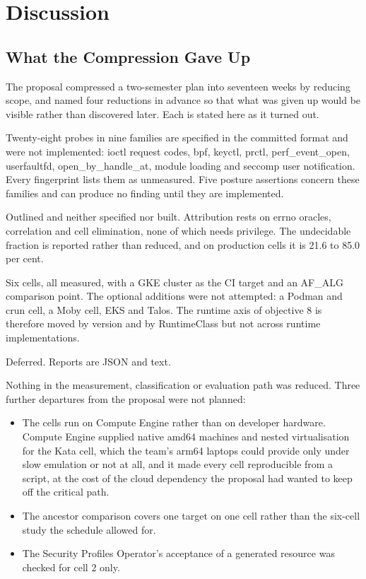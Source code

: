 \chapter{Discussion}
\label{ch:discussion}

\section{What the Compression Gave Up}

The proposal compressed a two-semester plan into seventeen weeks by reducing scope, and named four reductions in advance so that what was given up would be visible rather than discovered later. Each is stated here as it turned out.

\begin{description}[font=\normalfont\bfseries,leftmargin=1em]
\item[The deferred corpus set.] Twenty-eight probes in nine families are specified in the committed format and were not implemented: ioctl request codes, bpf, keyctl, prctl, perf\_event\_open, userfaultfd, open\_by\_handle\_at, module loading and seccomp user notification. Every fingerprint lists them as unmeasured. Five posture assertions concern these families and can produce no finding until they are implemented.
\item[The privileged helper.] Outlined and neither specified nor built. Attribution rests on errno oracles, correlation and cell elimination, none of which needs privilege. The undecidable fraction is reported rather than reduced, and on production cells it is 21.6 to 85.0 per cent.
\item[The environment matrix.] Six cells, all measured, with a GKE cluster as the CI target and an AF\_ALG comparison point. The optional additions were not attempted: a Podman and crun cell, a Moby cell, EKS and Talos. The runtime axis of objective 8 is therefore moved by version and by RuntimeClass but not across runtime implementations.
\item[SARIF output.] Deferred. Reports are JSON and text.
\end{description}

Nothing in the measurement, classification or evaluation path was reduced. Three further departures from the proposal were not planned:
\begin{itemize}[leftmargin=*]
\item The cells run on Compute Engine rather than on developer hardware. Compute Engine supplied native amd64 machines and nested virtualisation for the Kata cell, which the team's arm64 laptops could provide only under slow emulation or not at all, and it made every cell reproducible from a script, at the cost of the cloud dependency the proposal had wanted to keep off the critical path.
\item The ancestor comparison covers one target on one cell rather than the six-cell study the schedule allowed for.
\item The Security Profiles Operator's acceptance of a generated resource was checked for cell 2 only.
\end{itemize}

